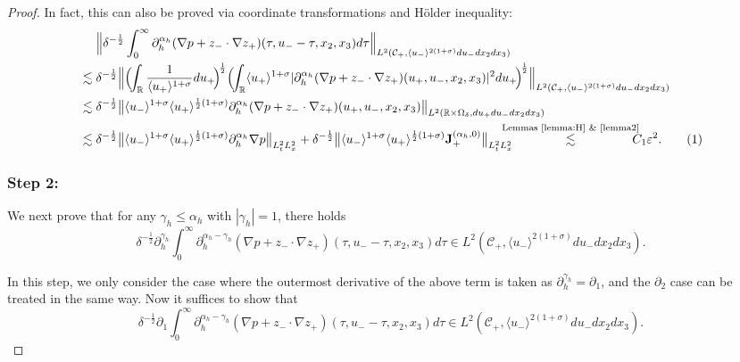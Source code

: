 \documentclass[10pt,reqno]{amsart}
\numberwithin{equation}{section}
\begin{document}
\begin{proof}
In fact, 
this can also be proved via coordinate transformations and H\"older inequality:
\begin{align*}
&\ \ \ \ \Big\|\delta^{-\frac{1}{2}}\int_0^{\infty} \partial_h^{\alpha_h}(\nabla p+z_{-}\cdot\nabla z_{+}) 
(\tau,u_--\tau,x_2,x_3)d\tau\Big\|_{L^2(\mathcal{C}_+,\langle u_-\rangle^{2(1+\sigma)}du_-dx_2dx_3)}\\
&
\lesssim\delta^{-\frac{1}{2}}\Big\|\Big(\!\!\int_{\mathbb{R}}\frac{1}{\langle u_+\rangle^{1+\sigma}}du_+\!\Big)^{\!\frac{1}{2}}\Big(\!\!\int_{\mathbb{R}}\langle u_+\rangle^{1+\sigma} |\partial_h^{\alpha_h}(\nabla p+z_{-}\cdot\nabla z_{+}) 
(u_+,u_-,x_2,x_3)|^2du_+\!\Big)^{\!\frac{1}{2}}\Big\|_{L^2(\mathcal{C}_+,\langle u_-\rangle^{2(1+\sigma)}du_-dx_2dx_3)}\\
&\lesssim\delta^{-\frac{1}{2}}\big\|\langle u_-\rangle^{1+\sigma}\langle u_+\rangle^{\frac{1}{2}(1+\sigma)} \partial_h^{\alpha_h}(\nabla p+z_{-}\cdot\nabla z_{+}) 
(u_+,u_-,x_2,x_3)\big\|_{L^2(\mathbb{R}\times\Omega_\delta,du_+du_-dx_2dx_3)}\\
&\lesssim\delta^{-\frac{1}{2}}\big\|\langle u_-\rangle^{1+\sigma}\langle u_+\rangle^{\frac{1}{2}(1+\sigma)}\partial_{h}^{\alpha_h} \nabla p\big\|_{L^2_tL^2_x}+\delta^{-\frac{1}{2}}\big\|\langle u_-\rangle^{1+\sigma}\langle u_+\rangle^{\frac{1}{2}(1+\sigma)}\mathbf{J}_+^{(\alpha_h,0)}\big\|_{L^2_tL^2_x}\!\!\!\!\!\!\!
\stackrel{\text{Lemmas \ref{lemma:H} \&  \ref{lemma2}}}{\lesssim}\!\!\!\!\! C_1\varepsilon^2.\stepcounter{equation}\tag{\theequation}\label{eq:lemma1-7}
\end{align*}	
 
 
\subsubsection*{\bf Step 2:} We next prove that for any $\gamma_h\leqslant\alpha_h$ with $|\gamma_h|=1$, 
there holds 
\begin{equation}\label{eq:lemma1-8}
\delta^{-\frac{1}{2}}\partial_h^{\gamma_h}\int_0^{\infty} \partial_h^{\alpha_h-\gamma_h}(\nabla p+z_{-}\cdot\nabla z_{+}) 
(\tau,u_--\tau,x_2,x_3)d\tau\in L^2(\mathcal{C}_+,\langle u_-\rangle^{2(1+\sigma)}du_-dx_2dx_3).
\end{equation}

 
In this step, 
	we only consider the case where 
	the outermost derivative of the above term 
	is taken as  $\partial_h^{\gamma_h}=\partial_{1}$, and the $\partial_{2}$ case can be treated in the same way.  
	Now it suffices to show that 
	\begin{equation}\label{eq:lemma1-1}
	\delta^{-\frac{1}{2}}\partial_{1}\int_0^{\infty} \partial_h^{\alpha_h-\gamma_h}(\nabla p+z_{-}\cdot\nabla z_{+}) 
	(\tau,u_--\tau,x_2,x_3)d\tau\in L^2(\mathcal{C}_+,\langle u_-\rangle^{2(1+\sigma)}du_-dx_2dx_3).
	\end{equation}


\end{proof}
\end{document}
